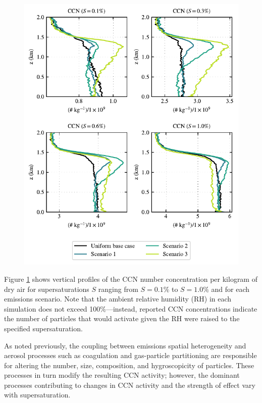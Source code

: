 \documentclass[journal abbreviation, manuscript]{copernicus}
\begin{document}
\begin{figure}[!h]
	\centering
	\includegraphics[]{figures/aerosol-ccn-vertical-profiles-time36.pdf}
	\caption{}
	\label{fig:ccn-vertical-prof}
\end{figure} 

Figure \ref{fig:ccn-vertical-prof} shows vertical profiles of the CCN number concentration per kilogram of dry air for supersaturations $S$ ranging from $S=0.1\%$ to $S=1.0\%$ and for each emissions scenario. Note that the ambient relative humidity (RH) in each simulation does not exceed 100\%---instead, reported CCN concentrations indicate the number of particles that would activate given the RH were raised to the specified supersaturation.

As noted previously, the coupling between emissions spatial heterogeneity and aerosol processes such as coagulation and gas-particle partitioning are responsible for altering the number, size, composition, and hygroscopicity of particles. These processes in turn modify the resulting CCN activity; however, the dominant processes contributing to changes in CCN activity and the strength of effect vary with supersaturation. 
\end{document}
